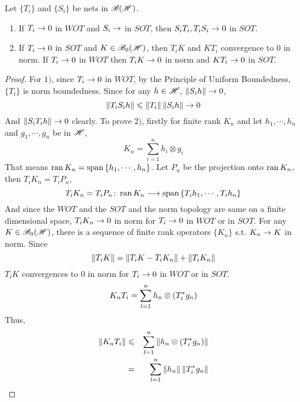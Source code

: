 \documentclass[a4paper,11pt]{report}
\begin{document}
\begin{prop}
	Let $\{T_i\}$ and $\{S_i\}$ be nets in $\mathscr{B(H)}$.
	\begin{enumerate}[label=\arabic*)]
		\item If $T_i \rightarrow 0$ in $WOT$ and $S_i \rightarrow$ in $SOT$, then $S_iT_i,T_iS_i \rightarrow 0$ in $SOT$.
		\item If $T_i \rightarrow 0$ in $SOT$ and $K \in \mathscr{B}_{0}\mathscr{(H)}$, then $T_iK$ and $KT_i$ convergence to $0$ in norm. If $T_i \rightarrow 0$ in $WOT$ then $T_iK \rightarrow 0$ in norm and $KT_i \rightarrow 0$ in $SOT$.
	\end{enumerate}
\end{prop}
\begin{proof}
	For $1)$, since $T_i \rightarrow 0$ in $WOT$, by the Principle of Uniform Boundedness, $\{T_i\}$ is norm boundedness. Since for any $h \in \mathscr{H}$, $\left\lVert S_i h\right\lVert \rightarrow 0$,
	\begin{equation*}
		\left\lVert T_iS_i h\right\lVert \leqslant \left\lVert T_i\right\lVert \left\lVert S_i h\right\lVert \rightarrow 0
	\end{equation*}
	And $\left\lVert S_iT_i h\right\lVert \rightarrow 0$ clearly.
	To prove $2)$, firstly for finite rank $K_n$ and let $h_1,\cdots,h_n$ and $g_1,\cdots,g_n$ be in $\mathscr{H}$,
	\begin{equation*}
		K_n = \sum_{i=1}^n h_i \otimes g_i
	\end{equation*}
	That means $\operatorname{ran}{K_n} = \operatorname{span}{\{h_1, \cdots, h_n\}}$. Let $P_n$ be the projection onto $\operatorname{ran}{K_n}$, then $T_iK_n = T_iP_n$, 
	\begin{equation*}
		T_iK_n = T_iP_n \colon \operatorname{ran}{K_n} \longrightarrow \operatorname{span}{\{T_ih_1, \cdots, T_ih_n\}}
	\end{equation*}
	And since the $WOT$ and the $SOT$ and the norm topology are same on a finite dimensional space, $T_iK_n \rightarrow 0$ in norm for $T_i \rightarrow 0$ in $WOT$ or in $SOT$. For any $K \in \mathscr{B}_{0}\mathscr{(H)}$, there is a sequence of finite rank operators $\{K_n\}$ s.t. $K_n \rightarrow K$ in norm. Since
	\begin{equation*}
		\left\lVert T_iK\right\lVert = \left\lVert T_iK - T_iK_n\right\lVert + \left\lVert T_iK_n\right\lVert
	\end{equation*}
	$T_iK$ convergences to $0$ in norm for $T_i \rightarrow 0$ in $WOT$ or in $SOT$.
	\begin{equation*}
		K_nT_i = \sum_{l=1}^{n} h_n \otimes (T_i^{*}g_n)
	\end{equation*}
	Thus,
	\begin{eqnarray*}
		\left\lVert K_nT_i\right\lVert &\leqslant& \sum_{l=1}^{n} \left\lVert h_n \otimes (T_i^{*}g_n)\right\lVert \\
		&=& \sum_{l=1}^n \left\lVert h_n\right\lVert\left\lVert T_i^{*} g_n\right\lVert
	\end{eqnarray*}

\end{proof}
\end{document}

